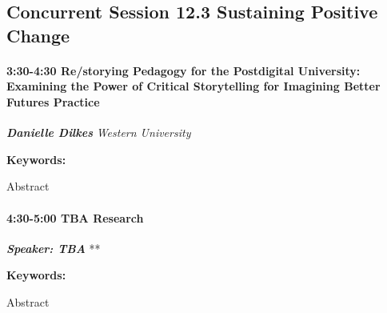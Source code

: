 \documentclass[
]{book}
\begin{document}
\hypertarget{concurrent-session-12.3-sustaining-positive-change}{%
\subsection*{Concurrent Session 12.3 \textbar{} Sustaining Positive Change}\label{concurrent-session-12.3-sustaining-positive-change}}

\begin{session}
\hypertarget{restorying-pedagogy-for-the-postdigital-university-examining-the-power-of-critical-storytelling-for-imagining-better-futures-practice}{%
\paragraph*{\texorpdfstring{3:30-4:30 \textbar{} \textbf{Re/storying
Pedagogy for the Postdigital University: Examining the Power of Critical
Storytelling for Imagining Better Futures} \textbar{}
Practice}{3:30-4:30 \textbar{} Re/storying Pedagogy for the Postdigital University: Examining the Power of Critical Storytelling for Imagining Better Futures \textbar{} Practice}}\label{restorying-pedagogy-for-the-postdigital-university-examining-the-power-of-critical-storytelling-for-imagining-better-futures-practice}}

\textbf{\emph{Danielle Dilkes}} \textbar{} \emph{Western University}

\textbf{Keywords:}

Abstract
\end{session}

\begin{session}
\hypertarget{tba-research}{%
\paragraph*{\texorpdfstring{4:30-5:00 \textbar{} \textbf{TBA} \textbar{}
Research}{4:30-5:00 \textbar{} TBA \textbar{} Research}}\label{tba-research}}

\textbf{\emph{Speaker: TBA}} \textbar{} **

\textbf{Keywords:}

Abstract
\end{session}
\end{document}
